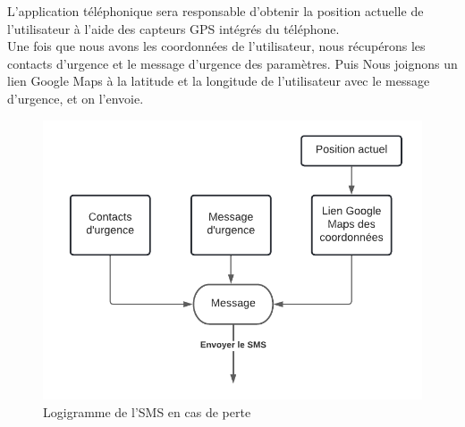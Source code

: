 L’application téléphonique sera responsable d’obtenir la position actuelle de l’utilisateur à l’aide des capteurs \acrshort{GPS} intégrés du téléphone. \\
Une fois que nous avons les coordonnées de l’utilisateur, nous récupérons les contacts d’urgence et le message d’urgence des paramètres. Puis Nous joignons un lien Google Maps à la latitude et la longitude de l’utilisateur avec le message d’urgence, et on l’envoie.

\begin{figure}[!htbp]
    \centering
    \includegraphics[width=.7\linewidth]{assets/SMS/diagramme simplified.png}
    \caption{Logigramme de l'SMS en cas de perte}
\end{figure}

\FloatBarrier



